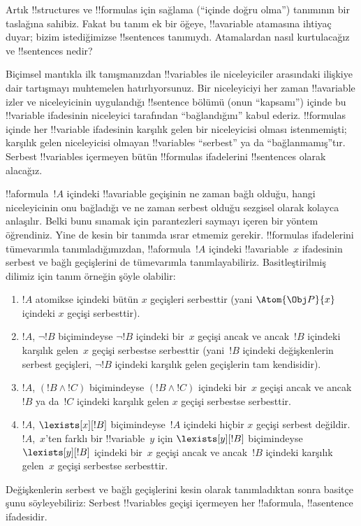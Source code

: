 \documentclass[../../../include/open-logic-section]{subfiles}
\begin{document}


Artık !!{structure}s ve !!{formula}s için sağlama (``içinde doğru
olma'') tanımının bir taslağına sahibiz. Fakat bu tanım ek bir öğeye,
!!a{variable} atamasına ihtiyaç duyar; bizim istediğimizse
!!{sentence}s tanımıydı. Atamalardan nasıl kurtulacağız ve
!!{sentence}s nedir?

Biçimsel mantıkla ilk tanışmanızdan !!{variable}s ile niceleyiciler
arasındaki ilişkiye dair tartışmayı muhtemelen hatırlıyorsunuz. Bir
niceleyiciyi her zaman !!a{variable} izler ve niceleyicinin uygulandığı
!!{sentence} bölümü (onun ``kapsamı'') içinde bu !!{variable}
ifadesinin niceleyici tarafından ``bağlandığını'' kabul ederiz.
!!{formula}s içinde her !!{variable} ifadesinin karşılık gelen bir
niceleyicisi olması istenmemişti; karşılık gelen niceleyicisi olmayan
!!{variable}s ``serbest'' ya da ``bağlanmamış''tır. Serbest
!!{variable}s içermeyen bütün !!{formula}s ifadelerini !!{sentence}s
olarak alacağız.

!!a{formula}~$!A$ içindeki !!a{variable} geçişinin ne zaman bağlı
olduğu, hangi niceleyicinin onu bağladığı ve ne zaman serbest olduğu
sezgisel olarak kolayca anlaşılır. Belki bunu sınamak için parantezleri
saymayı içeren bir yöntem öğrendiniz. Yine de kesin bir tanımda ısrar
etmemiz gerekir. !!{formula}s ifadelerini tümevarımla tanımladığımızdan,
!!a{formula}~$!A$ içindeki !!a{variable}~$x$ ifadesinin serbest ve
bağlı geçişlerini de tümevarımla tanımlayabiliriz. Basitleştirilmiş
dilimiz için tanım örneğin şöyle olabilir:
\begin{enumerate}
  \item $!A$ atomikse içindeki bütün $x$ geçişleri serbesttir (yani
  $\Atom{\Obj P}{x}$ içindeki $x$ geçişi serbesttir).
  \item $!A$, $\lnot !B$ biçimindeyse $\lnot !B$ içindeki bir~$x$
  geçişi ancak ve ancak~$!B$ içindeki karşılık gelen~$x$ geçişi
  serbestse serbesttir (yani~$!B$ içindeki değişkenlerin serbest
  geçişleri, $\lnot !B$ içindeki karşılık gelen geçişlerin tam
  kendisidir).
  \item $!A$, $(!B\land !C)$ biçimindeyse $(!B\land !C)$ içindeki
  bir~$x$ geçişi ancak ve ancak~$!B$ ya da~$!C$ içindeki karşılık gelen
  $x$ geçişi serbestse serbesttir.
  \item $!A$, $\lexists[x][!B]$ biçimindeyse~$!A$ içindeki hiçbir
  $x$ geçişi serbest değildir. $!A$,~$x$'ten farklı bir
  !!{variable}~$y$ için $\lexists[y][!B]$ biçimindeyse
  $\lexists[y][!B]$ içindeki bir~$x$ geçişi ancak ve ancak~$!B$
  içindeki karşılık gelen~$x$ geçişi serbestse serbesttir.
\end{enumerate}

Değişkenlerin serbest ve bağlı geçişlerini kesin olarak tanımladıktan
sonra basitçe şunu söyleyebiliriz: Serbest !!{variable}s geçişi
içermeyen her !!a{formula}, !!a{sentence} ifadesidir.
\end{document}
